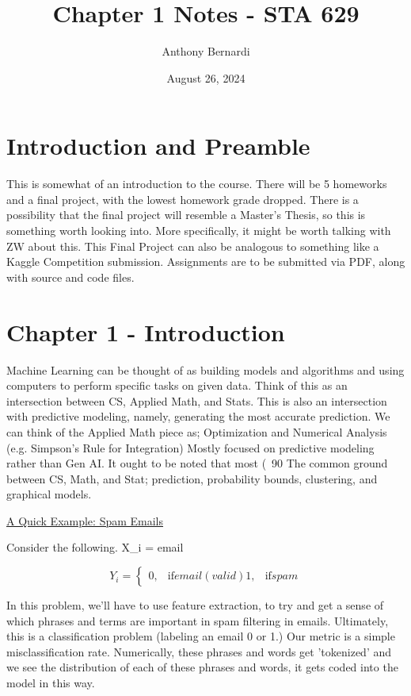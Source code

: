 \documentclass[12pt, letterpaper]{article}
\title{Chapter 1 Notes - STA 629}
\author{Anthony Bernardi}
\date{August 26, 2024}
\begin{document}
\maketitle

\section{Introduction and Preamble}

This is somewhat of an introduction to the course. There will be 5 homeworks and a final project, with the lowest homework grade dropped. There is a possibility that the final project will resemble a Master's Thesis, so this is something worth looking into. More specifically, it might be worth talking with ZW about this. 
This Final Project can also be analogous to something like a Kaggle Competition submission. 
Assignments are to be submitted via PDF, along with source and code files. 

\section{Chapter 1 - Introduction}

Machine Learning can be thought of as building models and algorithms and using computers to perform specific tasks on given data. 
Think of this as an intersection between CS, Applied Math, and Stats. 
This is also an intersection with predictive modeling, namely, generating the most accurate prediction. 
We can think of the Applied Math piece as; Optimization and Numerical Analysis (e.g. Simpson's Rule for Integration)
Mostly focused on predictive modeling rather than Gen AI. 
It ought to be noted that most (~90 %
The common ground between CS, Math, and Stat; prediction, probability bounds, clustering, and graphical models. 

\underline{A Quick Example: Spam Emails}

Consider the following. 
X_i = email 

\[
	Y_i = 
	\begin{cases}
		0, & \text{if} email (valid)
		1, & \text{if} spam 
	\end{cases}
\]

In this problem, we'll have to use feature extraction, to try and get a sense of which phrases and terms are important in spam filtering in emails. 
Ultimately, this is a classification problem (labeling an email 0 or 1.)
Our metric is a simple misclassification rate. 
Numerically, these phrases and words get 'tokenized' and we see the distribution of each of these phrases and words, it gets coded into the model in this way.
\end{document}
